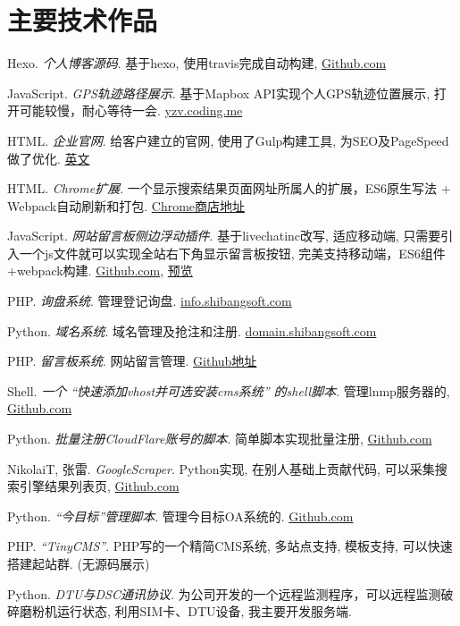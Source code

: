 
\section{\textbf{主要技术作品}}
 \resumeSubHeadingListStart
    \item{
       Hexo.
       \emph{个人博客源码}.
       基于hexo, 使用travis完成自动构建, \href{https://github.com/leadscloud/leadscloud.github.io/tree/source}{Github.com}
   }
   \item{
       JavaScript.
       \emph{GPS轨迹路径展示}.
       基于Mapbox API实现个人GPS轨迹位置展示, 打开可能较慢，耐心等待一会. \href{http://yzv.coding.me/#portfolio/portfolio-4}{yzv.coding.me}
   }
   \item{
       HTML.
       \emph{企业官网}.
       给客户建立的官网, 使用了Gulp构建工具, 为SEO及PageSpeed做了优化. \href{https://www.kamychina.com/}{英文}
   }
   \item{
       HTML.
       \emph{Chrome扩展}.
       一个显示搜索结果页面网址所属人的扩展，ES6原生写法 + Webpack自动刷新和打包. \href{https://chrome.google.com/webstore/detail/ifbiiojnbgljbjffmacihhdkeomdkifc}{Chrome商店地址}
   }
   \item{
       JavaScript.
       \emph{网站留言板侧边浮动插件}.
       基于livechatinc改写, 适应移动端, 只需要引入一个js文件就可以实现全站右下角显示留言板按钮, 完美支持移动端，ES6组件+webpack构建. \href{https://github.com/leadscloud/leadscloud.github.io/tree/master/livechat}{Github.com},
       \href{https://www.kamychina.com/}{预览}
   }
   \item{
       PHP.
       \emph{询盘系统}.
       管理登记询盘. \href{http://info.shibangsoft.com}{info.shibangsoft.com}
   }
   \item{
       Python.
       \emph{域名系统}.
       域名管理及抢注和注册. \href{http://domain.shibangsoft.com}{domain.shibangsoft.com}
   }
   \item{
       PHP.
       \emph{留言板系统}.
       网站留言管理.  \href{https://github.com/leadscloud/inquiry}{Github地址}
   }
   \item{
       Shell.
       \emph{一个 ``快速添加vhost并可选安装cms系统'' 的shell脚本}.
       管理lnmp服务器的, \href{https://github.com/leadscloud/Tools}{Github.com}
   }
   \item{
       Python.
       \emph{批量注册CloudFlare账号的脚本}.
       简单脚本实现批量注册, \href{https://github.com/leadscloud/cloudflare}{Github.com}
   }
   \item{
       NikolaiT, 张雷.
       \emph{GoogleScraper}.
       Python实现, 在别人基础上贡献代码, 可以采集搜索引擎结果列表页, \href{https://github.com/NikolaiT/GoogleScraper/blob/master/AUTHORS}{Github.com}
   }
   \item{
       Python.
       \emph{``今目标''管理脚本}.
       管理今目标OA系统的. \href{https://github.com/leadscloud/Jingoal}{Github.com}
   }
   \item{
       PHP.
       \emph{``TinyCMS''}.
       PHP写的一个精简CMS系统, 多站点支持, 模板支持, 可以快速搭建起站群. (无源码展示)
   }
   \item{
       Python.
       \emph{DTU与DSC通讯协议}.
       为公司开发的一个远程监测程序，可以远程监测破碎磨粉机运行状态, 利用SIM卡、DTU设备, 我主要开发服务端.
   }

 \resumeSubHeadingListEnd
